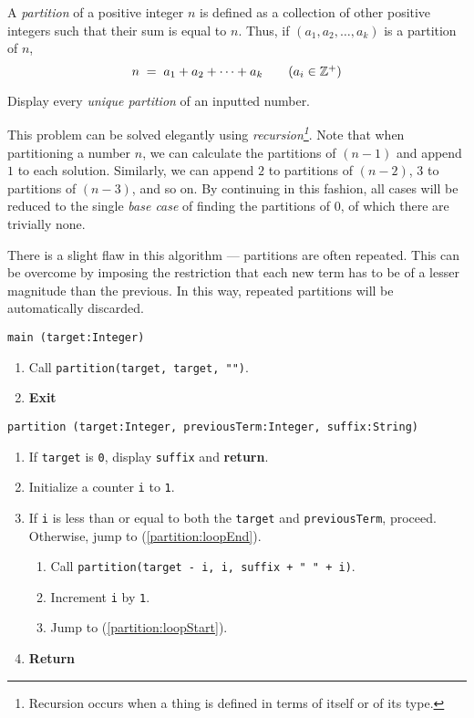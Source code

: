 

\problem A {\em partition} of a positive integer $n$ is defined as a collection of other positive integers such that
their sum is equal to $n$. Thus, if $(a_1, a_2, \dots, a_k)$ is a partition of $n$,
\begin{equation*}
	n	\;=\;	a_1 + a_2 + \dots + a_k 			\tag{$a_i \in \mathbb{Z}^{+}$}
\end{equation*}

Display every {\em unique partition} of an inputted number.

\solution This problem can be solved elegantly using {\em recursion\footnote{Recursion occurs when a thing is defined in terms of itself or of its type.}}. Note that when partitioning a number $n$, we can calculate the partitions of $(n - 1)$ and append $1$ to each solution. Similarly, we can append $2$ to partitions of $(n - 2)$, $3$ to partitions of $(n - 3)$, and so on. By continuing in this fashion, all cases will be reduced to the single {\em base case} of finding the partitions of $0$, of which there are trivially none.

There is a slight flaw in this algorithm --- partitions are often repeated. This can be overcome by imposing the restriction that each new term has to be of a lesser magnitude than the previous. In this way, repeated partitions will be automatically discarded.

\algorithm
{\tt main (target:Integer)}
\begin{enumerate}
	\item	Call {\tt partition(target, target, "")}.
	\item	{\bf Exit}
\end{enumerate}
\vspace{5mm}
{\tt partition (target:Integer, previousTerm:Integer, suffix:String)}
\begin{enumerate}
	\item	If {\tt target} is {\tt 0}, display {\tt suffix} and {\bf return}.
	\item	Initialize a counter {\tt i} to {\tt 1}.
	\item	If {\tt i} is less than or equal to both the {\tt target} and {\tt previousTerm}, proceed.
			Otherwise, jump to (\ref{partition:loopEnd}). \label{partition:loopStart}
	\begin{enumerate}
		\item	Call {\tt partition(target - i, i, suffix + " " + i)}.
		\item	Increment {\tt i} by {\tt 1}.
		\item	Jump to (\ref{partition:loopStart}).
	\end{enumerate}
	\item	{\bf Return} \label{partition:loopEnd}
\end{enumerate}

\sourcecode
